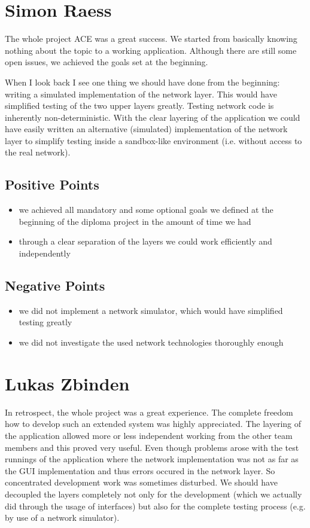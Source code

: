 \section{Simon Raess}
The whole project ACE was a great success. We started from basically knowing
nothing about the topic to a working application. Although there are still
some open issues, we achieved the goals set at the beginning. 

When I look back I see one thing we should have done from the beginning:
writing a simulated implementation of the network layer. This would have
simplified testing of the two upper layers greatly. Testing network code is inherently non-deterministic. With the clear layering of the application 
we could have easily written an alternative (simulated) implementation of
the network layer to simplify testing inside a sandbox-like environment (i.e.
without access to the real network).

\subsection{Positive Points}
\begin{itemize}
 \item we achieved all mandatory and some optional goals we defined at the beginning of the diploma project in the amount of time we had
 \item through a clear separation of the layers we could work efficiently and independently
\end{itemize}

\subsection{Negative Points}
\begin{itemize}
 \item we did not implement a network simulator, which would have simplified testing greatly
 \item we did not investigate the used network technologies thoroughly enough
\end{itemize}



\section{Lukas Zbinden}
In retrospect, the whole project was a great experience. The complete freedom how to develop such an extended system was highly appreciated. The layering of the application allowed more or less independent working from the other team members and this proved very useful. Even though problems arose with the test runnings of the application where the network implementation was not as far as the GUI implementation and thus errors occured in the network layer. So concentrated development work was sometimes disturbed. We should have decoupled the layers completely not only for the development (which we actually did through the usage of interfaces) but also for the complete testing process (e.g. by use of a network simulator). 

